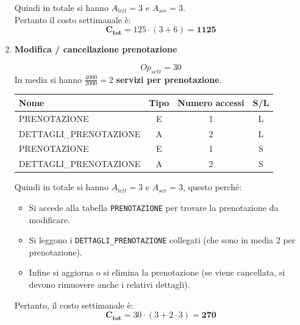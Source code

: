\documentclass[a4paper,12pt]{report}
\begin{document}
\begin{enumerate}
	      Quindi in totale si hanno $A_{lett}=3$ e $A_{scr}=3$. \\
	      Pertanto il costo settimanale è:
	      $$\mathbf{C_{tot}} = 125 \cdot (3+6)=\mathbf{1125}$$



	\item {\large \textbf{Modifica / cancellazione prenotazione}} \label{op4}

	      $$
		      {Op}_{sett} = 30
	      $$
	      In media si hanno $\frac{4000}{2000}=2$ \textbf{servizi per prenotazione}.

	      \begin{table}[H]
		      \centering
		      \small
		      \renewcommand{\arraystretch}{1.15}
		      \begin{tabularx}{0.8\textwidth}{|X|c|c|c|}
			      \hline
			      \rowcolor{gray!20}
			      \textbf{Nome}          & \textbf{Tipo} & \textbf{Numero accessi} & \textbf{S/L} \\
			      \hline
			      PRENOTAZIONE           & E             & 1                       & L            \\
			      DETTAGLI\_PRENOTAZIONE & A             & 2                       & L            \\
			      PRENOTAZIONE           & E             & 1                       & S            \\
			      DETTAGLI\_PRENOTAZIONE & A             & 2                       & S            \\
			      \hline
		      \end{tabularx}
	      \end{table}

	      Quindi in totale si hanno $A_{lett}=3$ e $A_{scr}=3$, questo perché:
	      \begin{itemize}
		      \item Si accede alla tabella \texttt{PRENOTAZIONE} per trovare la prenotazione da modificare.
		      \item Si leggono i \texttt{DETTAGLI\_PRENOTAZIONE} collegati (che sono in media 2 per prenotazione).
		      \item Infine si aggiorna o si elimina la prenotazione (se viene cancellata, si devono rimuovere anche i relativi dettagli).
	      \end{itemize}

	      Pertanto, il costo settimanale è:
	      $$
		      \mathbf{C_{tot}} = 30 \cdot (3 + 2 \cdot 3) = \mathbf{270}
	      $$



\end{enumerate}
\end{document}
